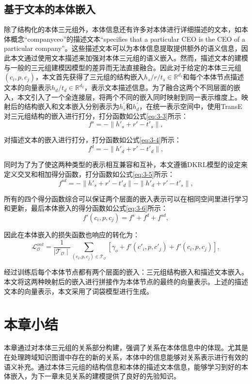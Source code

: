 \subsection{基于文本的本体嵌入}
除了结构化的本体三元组外，本体信息还有许多对本体进行详细描述的文本，如本体概念“companyceo”的描述文本“specifies that a particular CEO is the CEO of a particular company”。这些描述文本可以为本体信息提取提供额外的语义信息，因此本文通过使用文本描述来加强对本体三元组的语义嵌入。然而，描述文本的建模与一般的三元组建模因模型的差异而无法直接融合。因此对于给定的本体三元组\((c_{i},p,c_{j})\)，本文首先获得了三元组的结构嵌入\(h_{s}/r/t_{s} \in \mathbb{R}^{d_{1}}\)和每个本体节点描述文本的向量表示\(h_{d}/t_{d} \in \mathbb{R}^{d_{2}}\)，表示文本描述信息。为了融合这两个不同层面的嵌入，本文引入了一个全连接层，将两个不同的嵌入同时映射到同一表示维度上。映射后的结构嵌入和文本嵌入分别表示为\(h_{s}^{'}\)和\(h_{d}^{'}\)，在统一表示空间中，使用TransE对三元组结构的嵌入进行打分，打分函数如公式\ref{eq:3-3}所示：
\begin{equation}
  f^{s} = -  \parallel h'_{s} + r' - t'_{s}  \parallel, \label{eq:3-3}
\end{equation}

对描述文本的嵌入进行打分，打分函数如公式\ref{eq:3-4}所示：
\begin{equation}
  f^{d} = -  \parallel h'_{d} + r' - t'_{d}  \parallel, \label{eq:3-4}
\end{equation}

同时为了为了使这两种类型的表示相互兼容和互补，本文遵循DKRL模型的设定来定义交叉和相加得分函数，打分函数如公式\ref{eq:3-5}所示：
\begin{equation}
  f^{sd} = -  \parallel h'_{s} + r' - t'_{d}  \parallel -  \parallel h'_{d} + r' - t'_{s}  \parallel, \label{eq:3-5}
\end{equation}

所有的四个得分函数综合可以保证两个层面的嵌入表示可以在相同空间里进行学习和更新，最后本体嵌入的得分函数如公式\ref{eq:3-6}所示：
\begin{equation}
  f'(c_{i},p,c_{j}) = f^{s} + f^{d} +f^{sd}, \label{eq:3-6}
\end{equation}

因此在本体嵌入的损失函数也响应的转化为：
\begin{equation}
  \mathcal{L}_{\mathcal{O}}^{ont} = \frac{1}{\mid \mathcal{T}_{\mathcal{O}}\mid} \sum_{(c_{i},p,c_{j}) \in \mathcal{T}_{\mathcal{O}}} [\gamma _{o} + f'(c'_{i},p,c'_{j}) + f'(c_{i},p,c_{j})], \label{eq:3-7}
\end{equation}

经过训练后每个本体节点都有两个层面的嵌入：三元组结构嵌入和描述文本嵌入。本文将这两种映射后的嵌入进行拼接作为本体节点的最终的向量表示。上述的描述文本的向量表示，本文采用了词袋模型进行生成。

\section{本章小结}
本章通过对本体三元组的关系部分构建，强调了关系在本体信息中的体现。尤其是在处理跨域知识图谱中存在的新的关系，本体中的信息能够对关系表示进行有效的语义补充。通过本体三元组的结构信息和本体的描述文本信息，能够学习到好的本体嵌入，为下一章未见关系的建模提供了良好的先验知识。